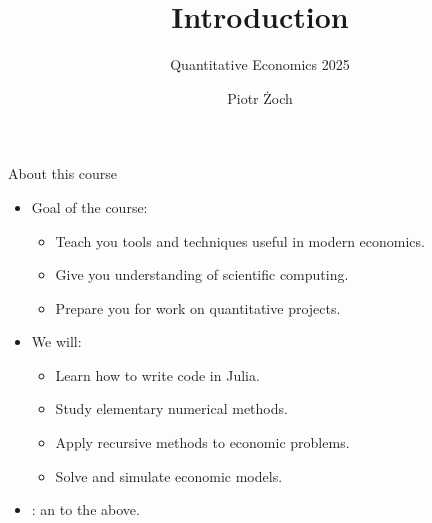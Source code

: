 \documentclass[11pt,xcolor={dvipsnames},aspectratio=159,hyperref={pdftex,pdfpagemode=UseNone,hidelinks,pdfdisplaydoctitle=true},usepdftitle=false]{beamer}
\begin{document}
\title{Introduction}
\subtitle{Quantitative Economics 2025}

\author{Piotr Żoch}%
\frame{\titlepage}



\begin{frame}{About this course}
    \begin{itemize}
    \item Goal of the course:
    \begin{itemize}
        \item Teach you tools and techniques useful in modern economics.
        \item Give you understanding of scientific computing.
        \item Prepare you for work on quantitative projects.
    \end{itemize}

    \item We will:
    \begin{itemize}
        \item Learn how to write code in Julia.
        \item Study elementary numerical methods.
        \item Apply recursive methods to economic problems.
        \item Solve and simulate economic models.
    \end{itemize}
    
    \item {}: an  to the above.
    
\end{itemize}
\end{frame}
\end{document}
